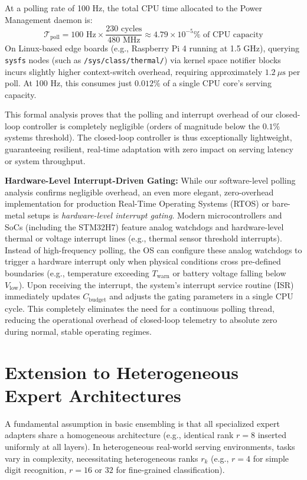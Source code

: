 \documentclass{article}
\theoremstyle{plain}
\theoremstyle{definition}
\theoremstyle{remark}
\begin{document}
At a polling rate of 100 Hz, the total CPU time allocated to the Power Management daemon is:
\begin{equation}
\mathcal{T}_{\text{poll}} = 100 \text{ Hz} \times \frac{230 \text{ cycles}}{480\text{ MHz}} \approx 4.79 \times 10^{-5}\% \text{ of CPU capacity}
\end{equation}
On Linux-based edge boards (e.g., Raspberry Pi 4 running at 1.5 GHz), querying \texttt{sysfs} nodes (such as \texttt{/sys/class/thermal/}) via kernel space notifier blocks incurs slightly higher context-switch overhead, requiring approximately $1.2\ \mu\text{s}$ per poll. At 100 Hz, this consumes just $0.012\%$ of a single CPU core's serving capacity.

This formal analysis proves that the polling and interrupt overhead of our closed-loop controller is completely negligible (orders of magnitude below the $0.1\%$ systems threshold). The closed-loop controller is thus exceptionally lightweight, guaranteeing resilient, real-time adaptation with zero impact on serving latency or system throughput.

\textbf{Hardware-Level Interrupt-Driven Gating:} While our software-level polling analysis confirms negligible overhead, an even more elegant, zero-overhead implementation for production Real-Time Operating Systems (RTOS) or bare-metal setups is \emph{hardware-level interrupt gating}. Modern microcontrollers and SoCs (including the STM32H7) feature analog watchdogs and hardware-level thermal or voltage interrupt lines (e.g., thermal sensor threshold interrupts). Instead of high-frequency polling, the OS can configure these analog watchdogs to trigger a hardware interrupt only when physical conditions cross pre-defined boundaries (e.g., temperature exceeding $T_{\text{warn}}$ or battery voltage falling below $V_{\text{low}}$). Upon receiving the interrupt, the system's interrupt service routine (ISR) immediately updates $C_{\text{budget}}$ and adjusts the gating parameters in a single CPU cycle. This completely eliminates the need for a continuous polling thread, reducing the operational overhead of closed-loop telemetry to absolute zero during normal, stable operating regimes.

\section{Extension to Heterogeneous Expert Architectures}
\label{app:heterogeneous_ranks}

A fundamental assumption in basic ensembling is that all specialized expert adapters share a homogeneous architecture (e.g., identical rank $r=8$ inserted uniformly at all layers). In heterogeneous real-world serving environments, tasks vary in complexity, necessitating heterogeneous ranks $r_k$ (e.g., $r = 4$ for simple digit recognition, $r = 16$ or $32$ for fine-grained classification).
\end{document}
